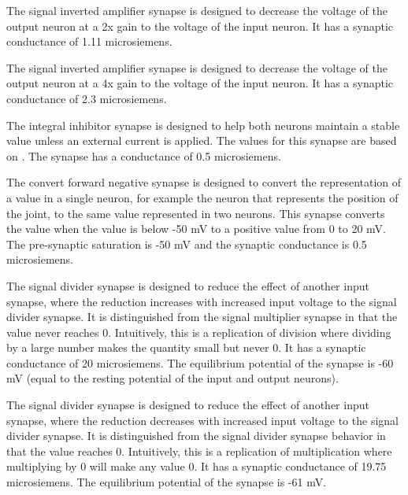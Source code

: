 
The signal inverted amplifier synapse is designed to decrease the voltage of
the output 
neuron at a 2x gain to the voltage of the input neuron. It has a synaptic 
conductance of 1.11 microsiemens.


The signal inverted amplifier synapse is designed to decrease the voltage of
the output 
neuron at a 4x gain to the voltage of the input neuron. It has a synaptic 
conductance of 2.3 microsiemens.


The integral inhibitor synapse is designed to help both neurons maintain a 
stable value unless an external current is applied. The values for this
synapse are based on \cite{NickFunctionalSubnetwork}. The synapse has a  
conductance of 0.5 microsiemens.


The convert forward negative synapse is designed to convert the representation
of a value in a single neuron, for example the neuron that represents the 
position of the joint, to the same value represented in two neurons. This
synapse converts the value when the value is below -50 mV to a positive value 
from 0 to 20 mV. The pre-synaptic
saturation is -50 mV and the synaptic conductance is 0.5 microsiemens.


The signal divider synapse is designed to reduce the effect of another input
synapse, where the reduction increases with increased input voltage to the
signal divider synapse. It is distinguished from the signal multiplier synapse
in that the value never reaches 0. Intuitively, this is a replication of 
division where dividing by a large number makes the quantity small but never 0.
It has a synaptic conductance of 20 microsiemens. The equilibrium potential of
the synapse is -60 mV (equal to the resting potential of the input and output
neurons).


The signal divider synapse is designed to reduce the effect of another input
synapse, where the reduction decreases with increased input voltage to the
signal divider synapse. It is distinguished from the signal divider synapse
behavior in that the value reaches 0. Intuitively, this is a replication of 
multiplication where multiplying by 0 will make any value 0.
It has a synaptic conductance of 19.75 microsiemens. The equilibrium potential 
of the synapse is -61 mV.

